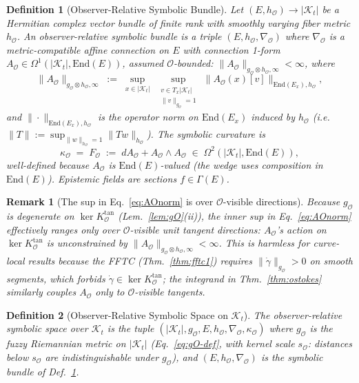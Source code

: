 \documentclass[11pt]{article}
\newtheorem{definition}{Definition}
\newtheorem{remark}{Remark}
\newcommand{\Kt}{\mathcal{K}_t}
\newcommand{\sO}{s_{\mathcal{O}}}  %
\newcommand{\Obs}{\mathcal{O}}
\newcommand{\kappaO}{\kappa_{\Obs}}
\newcommand{\FO}{F_{\Obs}}
\newcommand{\nablaO}{\nabla_{\Obs}}
\newcommand{\AO}{A_{\Obs}}
\newcommand{\gO}{g_{\Obs}}
\newcommand{\hO}{h_{\Obs}}
\newcommand{\KO}{K_{\Obs}}
\newcommand{\EE}{E}
\newcommand{\End}{\mathrm{End}}
\newcommand{\Sect}{\Gamma}
\begin{document}
\begin{definition}[Observer-Relative Symbolic Bundle]
\label{def:bundle}
Let $(\EE, \hO) \to |\Kt|$ be a Hermitian complex vector bundle of
finite rank with smoothly varying fiber metric $\hO$. An
\emph{observer-relative symbolic bundle} is a triple
$(\EE, \hO, \nablaO)$ where $\nablaO$ is a metric-compatible affine
connection on $\EE$ with connection 1-form
$\AO \in \Omega^1(|\Kt|, \End(\EE))$, assumed $\Obs$-bounded:
$\|\AO\|_{\gO \otimes \hO, \infty} < \infty$, where
\begin{equation}
\|\AO\|_{\gO \otimes \hO, \infty}
\;:=\; \sup_{x \in |\Kt|}\;
      \sup_{\substack{v \in T_x|\Kt|\\ \|v\|_{\gO} = 1}}\,
      \big\|\AO(x)[v]\big\|_{\End(\EE_x), \hO},
\label{eq:AOnorm}
\end{equation}
and $\|\cdot\|_{\End(\EE_x), \hO}$ is the operator norm on
$\End(\EE_x)$ induced by $\hO$
(i.e.\ $\|T\| := \sup_{\|w\|_{\hO}=1} \|Tw\|_{\hO}$).
The \emph{symbolic curvature} is
\[
\kappaO \;=\; \FO \;:=\; d\AO + \AO \wedge \AO \;\in\; \Omega^2(|\Kt|, \End(\EE)),
\]
well-defined because $\AO$ is $\End(\EE)$-valued (the wedge uses
composition in $\End(\EE)$). Epistemic fields are sections
$f \in \Sect(\EE)$.
\end{definition}

\begin{remark}[The sup in Eq.~\eqref{eq:AOnorm} is over $\Obs$-visible
directions]
\label{rem:AOnorm-visible}
Because $\gO$ is degenerate on $\ker \KO^{\mathrm{tan}}$
(Lem.~\ref{lem:gO}(ii)), the inner sup in Eq.~\eqref{eq:AOnorm}
effectively ranges only over $\Obs$-visible unit tangent directions:
$\AO$'s action on $\ker \KO^{\mathrm{tan}}$ is unconstrained by
$\|\AO\|_{\gO \otimes \hO, \infty} < \infty$. This is harmless for
curve-local results because the FFTC (Thm.~\ref{thm:fftc1}) requires
$\|\dot\gamma\|_{\gO} > 0$ on smooth segments, which forbids
$\dot\gamma \in \ker \KO^{\mathrm{tan}}$; the integrand in
Thm.~\ref{thm:ostokes} similarly couples $\AO$ only to $\Obs$-visible
tangents.
\end{remark}

\begin{definition}[Observer-Relative Symbolic Space on $\Kt$]
\label{def:space}
The \emph{observer-relative symbolic space} over $\Kt$ is the tuple
$(|\Kt|, \gO, \EE, \hO, \nablaO, \kappaO)$ where $\gO$ is the fuzzy
Riemannian metric on $|\Kt|$ (Eq.~\eqref{eq:gO-def}, with kernel
scale $\sO$: distances below $\sO$ are indistinguishable under
$\gO$), and $(\EE, \hO, \nablaO)$ is the symbolic bundle of
Def.~\ref{def:bundle}.
\end{definition}
\end{document}
